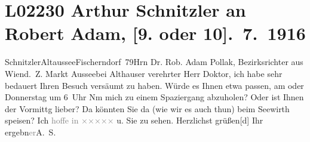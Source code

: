 

\section[Arthur Schnitzler an Robert Adam, {[}9. oder 10{]}. 7. 1916]{L02230 Arthur Schnitzler an Robert Adam, {[}9. oder 10{]}. 7. 1916}
\nopagebreak{}
\rehead{ }\normalsize\beginnumbering{}
\toendnotes[C]{\smallbreak\pagebreak[2]}
\toendnotes[C]{\smallbreak}
\toendnotes[C]{\smallbreak}\pstart{}{\pb}Schnitzler\pend{}\pstart{}Altaussee\pend{}\pstart{}Fischerndorf 79\pend{}{\bigskip}\pstart{}Hrn Dr. Rob. Adam Pollak, Bezirksrichter aus Wien\pend{}\pstart{}d. Z. Markt Aussee\pend{}\pstart{}bei Althauser\pend{}{\bigskip}\vspace{1em}
\pstart
           \noindent{}{\pb}verehrter Herr Doktor, ich habe sehr bedauert Ihren Besuch versäumt
               zu haben. Würde es Ihnen etwa passen, am \label{K_L02230-1v}\label{K_L02230-1} oder Donnerstag um 6 Uhr Nm mich zu einem
               Spaziergang abzuholen? Oder ist Ihnen der Vormittg lieber? Da könnten Sie da{\geminationn} (wie wir es auch thun) beim Seewirth speisen? Ich \textcolor{gray}{hoffe in}{ }\textcolor{gray}{×}\-\textcolor{gray}{×}\-\textcolor{gray}{×}\-\textcolor{gray}{×}\-\textcolor{gray}{×} u. Sie zu sehen. Herzlichst
                  grüßen{[}d{]} Ihr ergebn\textcolor{gray}{er}\spacefill\mbox{A. S.}\pend
           \endnumbering{}  \newcommand{\dateiname}{L02230}\newcommand{\titel}{Arthur Schnitzler an Robert Adam, [9. oder 10]. 7. 1916}\newcommand{\editorInnen}{Martin Anton Müller und Gerd-Hermann Susen}
